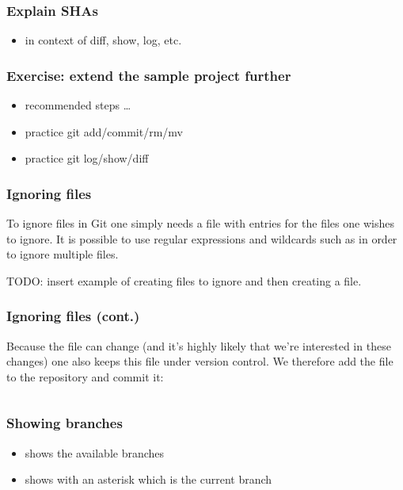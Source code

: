 \begin{frame}
\frametitle{Explain SHAs}
\begin{itemize}
    \item in context of diff, show, log, etc.
\end{itemize}
\end{frame}

\begin{frame}
\frametitle{Exercise: extend the sample project further}
\begin{itemize}
    \item recommended steps \ldots
    \item practice git add/commit/rm/mv
    \item practice git log/show/diff
\end{itemize}
\end{frame}

\begin{frame}
\frametitle{Ignoring files}

To ignore files in Git one simply needs a  file with
entries for the files one wishes to ignore. It is possible to use
regular expressions and wildcards such as  in order to ignore
multiple files.

TODO: insert example of creating files to ignore and then creating a
 file.
\end{frame}

\begin{frame}[fragile]
\frametitle{Ignoring files (cont.)}

Because the  file can change (and it’s highly likely
that we’re interested in these changes) one also keeps this file under
version control. We therefore add the file to the repository and commit
it:

    \inputminted{bash}{add-gitignore.txt}
\end{frame}

\begin{frame}[fragile]
\frametitle{Showing branches}

\begin{itemize}
    \item shows the available branches
    \item shows with an asterisk \code{*} which is the current branch
\end{itemize}

    \inputminted{bash}{git-show-branch-output.txt}
\end{frame}

